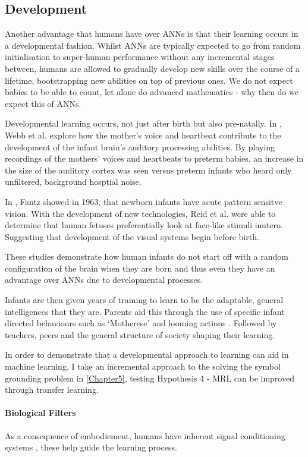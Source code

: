 \subsection{Development}
Another advantage that humans have over \acp{ANN} is that their learning occurs in a developmental fashion. Whilst \acp{ANN} are typically expected to go from random initialisation to super-human performance without any incremental stages between, humans are allowed to gradually develop new skills over the course of a lifetime, bootstrapping new abilities on top of previous ones. We do not expect babies to be able to count, let alone do advanced mathematics - why then do we expect this of \acp{ANN}.

Developmental learning occurs, not just after birth but also pre-natally. In \cite{webb2015mother}, Webb et al. explore how the mother's voice and heartbeat contribute to the development of the infant brain's auditory processing abilities. By playing recordings of the mothers' voices and heartbeats to preterm babies, an increase in the size of the auditory cortex was seen versus preterm infants who heard only unfiltered, background hosptial noise.


In \cite{fantz1963pattern}, Fantz showed in 1963, that newborn infants have acute pattern sensitve vision. With the development of new technologies, Reid et al. \cite{reid2017human} were able to determine that human fetuses preferentially look at face-like stimuli inutero. Suggesting that development of the visual systems begin before birth.

These studies demonstrate how human infants do not start off with a random configuration of the brain when they are born and thus even they have an advantage over \acp{ANN} due to developmental processes.

Infants are then given years of training to learn to be the adaptable, general intelligences that they are. Parents aid this through the use of specific infant directed behaviours such as `Motherese' \cite{fernald1987acoustic} and looming actions \cite{lohan2012contingency, lohan2012tutor}. Followed by teachers, peers and the general structure of society shaping their learning.

In order to demonstrate that a developmental approach to learning can aid in machine learning, I take an incremental approach to the solving the symbol grounding problem in \autoref{Chapter5}, testing Hypothesis 4 - \ac{MRL} can be improved through transfer learning. 

\paragraph{Biological Filters}
As a consequence of embodiement, humans have inherent signal conditioning systems \cite{pezzulo2013computational}, these help guide the learning process.

